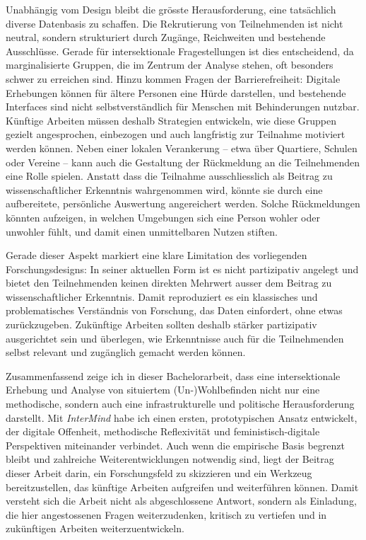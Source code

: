 Unabhängig vom Design bleibt die grösste Herausforderung, eine tatsächlich diverse Datenbasis zu schaffen. Die Rekrutierung von Teilnehmenden ist nicht neutral, sondern strukturiert durch Zugänge, Reichweiten und bestehende Ausschlüsse. Gerade für intersektionale Fragestellungen ist dies entscheidend, da marginalisierte Gruppen, die im Zentrum der Analyse stehen, oft besonders schwer zu erreichen sind. Hinzu kommen Fragen der Barrierefreiheit: Digitale Erhebungen können für ältere Personen eine Hürde darstellen, und bestehende Interfaces sind nicht selbstverständlich für Menschen mit Behinderungen nutzbar. Künftige Arbeiten müssen deshalb Strategien entwickeln, wie diese Gruppen gezielt angesprochen, einbezogen und auch langfristig zur Teilnahme motiviert werden können. Neben einer lokalen Verankerung -- etwa über Quartiere, Schulen oder Vereine -- kann auch die Gestaltung der Rückmeldung an die Teilnehmenden eine Rolle spielen. Anstatt dass die Teilnahme ausschliesslich als Beitrag zu wissenschaftlicher Erkenntnis wahrgenommen wird, könnte sie durch eine aufbereitete, persönliche Auswertung angereichert werden. Solche Rückmeldungen könnten aufzeigen, in welchen Umgebungen sich eine Person wohler oder unwohler fühlt, und damit einen unmittelbaren Nutzen stiften.

Gerade dieser Aspekt markiert eine klare Limitation des vorliegenden Forschungsdesigns: In seiner aktuellen Form ist es nicht partizipativ angelegt und bietet den Teilnehmenden keinen direkten Mehrwert ausser dem Beitrag zu wissenschaftlicher Erkenntnis. Damit reproduziert es ein klassisches und problematisches Verständnis von Forschung, das Daten einfordert, ohne etwas zurückzugeben. Zukünftige Arbeiten sollten deshalb stärker partizipativ ausgerichtet sein und überlegen, wie Erkenntnisse auch für die Teilnehmenden selbst relevant und zugänglich gemacht werden können.

Zusammenfassend zeige ich in dieser Bachelorarbeit, dass eine intersektionale Erhebung und Analyse von situiertem (Un\nobreakdash-)Wohl\-be\-find\-en nicht nur eine methodische, sondern auch eine infrastrukturelle und politische Herausforderung darstellt. Mit \textit{InterMind} habe ich einen ersten, prototypischen Ansatz entwickelt, der digitale Offenheit, methodische Reflexivität und feministisch-digitale Perspektiven miteinander verbindet. Auch wenn die empirische Basis begrenzt bleibt und zahlreiche Weiterentwicklungen notwendig sind, liegt der Beitrag dieser Arbeit darin, ein Forschungsfeld zu skizzieren und ein Werkzeug bereitzustellen, das künftige Arbeiten aufgreifen und weiterführen können. Damit versteht sich die Arbeit nicht als abgeschlossene Antwort, sondern als Einladung, die hier angestossenen Fragen weiterzudenken, kritisch zu vertiefen und in zukünftigen Arbeiten weiterzuentwickeln.

